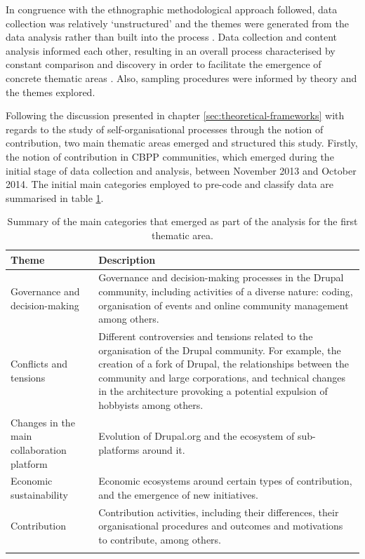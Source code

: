 In congruence with the ethnographic methodological approach followed, data collection was relatively `unstructured' and the themes were generated from the data analysis rather than built into the process \parencite[3]{hammersley2007ethnography}. Data collection and content analysis informed each other, resulting in an overall process characterised by constant comparison and discovery in order to facilitate the emergence of concrete thematic areas \parencite{altheide1987reflections}. Also, sampling procedures were informed by theory and the themes explored.

Following the discussion presented in chapter \ref{sec:theoretical-frameworks} with regards to the study of self-organisational processes through the notion of contribution, two main thematic areas emerged and structured this study. Firstly, the notion of contribution in CBPP communities, which emerged during the initial stage of data collection and analysis, between November 2013 and October 2014. The initial main categories employed to pre-code and classify data are summarised in table \ref{main-categories-TA1}.

\begin{footnotesize}
\begin{longtable}{|p{3cm}||p{9cm}|}

\hline
Theme                                      & Description \\ \hline \hline
Governance and decision-making             & Governance and decision-making processes in the Drupal community, including activities of a diverse nature: coding, organisation of events and online community management among others. \\ \hline
Conflicts and tensions                     & Different controversies and tensions related to the organisation of the Drupal community. For example, the creation of a fork of Drupal, the relationships between the community and large corporations, and technical changes in the architecture provoking a potential expulsion of hobbyists among others. \\ \hline
Changes in the main collaboration platform & Evolution of Drupal.org and the ecosystem of sub-platforms around it. \\ \hline
Economic sustainability                    & Economic ecosystems around certain types of contribution, and the emergence of new initiatives. \\ \hline
Contribution                               & Contribution activities, including their differences, their organisational procedures and outcomes and motivations to contribute, among others. \\ \hline
\caption[Summary of the main categories for the first thematic area]{Summary of the main categories that emerged as part of the analysis for the first thematic area.}
\label{main-categories-TA1}
\end{longtable}
\end{footnotesize}


